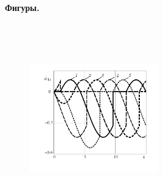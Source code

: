 % 

% 

% 

% 


\newpage

{\bf Фигуры.}

\begin{figure}[H]
        \centering
        \caption{\ }
        \label{fig:wheel}
    \endminipage
        \centering
        \caption{\ }
        \label{fig:vehicle}
    \endminipage
\end{figure}

\begin{figure}[H]
    \centering
    \quad
    \caption{\ }
    \label{fig:overlap_and_change}
\end{figure}



\begin{figure}[H]
  \includegraphics[width=0.5\textwidth]{pic/figure5_1.pdf}
  \caption{\ }
  \label{fig:selfrot}
\end{figure}

